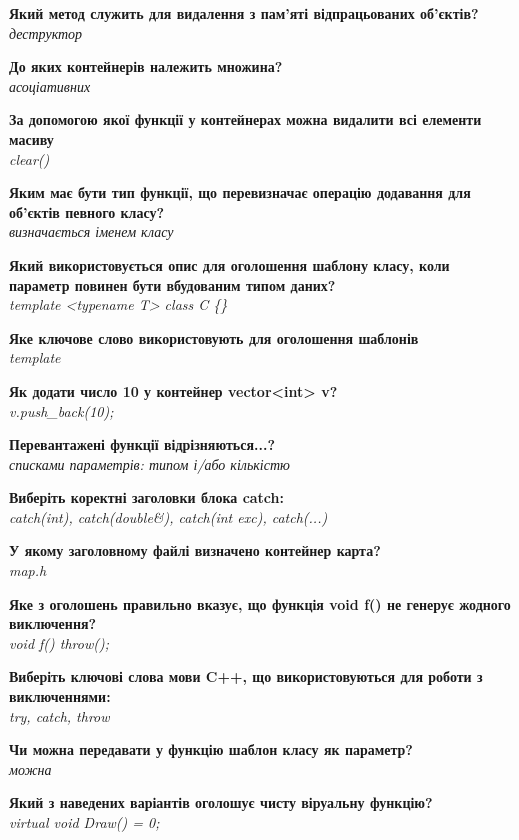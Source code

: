 \documentclass{article}
\begin{document}
\begin{list}{}{}
	\item \textbf{Який метод служить для видалення з пам'яті відпрацьованих об'єктів?} \\ \textit{деструктор}
	\item \textbf{До яких контейнерів належить множина?} \\ \textit{асоціативних}
	\item \textbf{За допомогою якої функції у контейнерах можна видалити всі елементи масиву} \\ \textit{clear()}
	\item \textbf{Яким має бути тип функції, що перевизначає операцію додавання для об'єктів певного класу?} \\ \textit{визначається іменем класу}
	\item \textbf{Який використовується опис для оголошення шаблону класу, коли параметр повинен бути вбудованим типом даних?} \\ \textit{template <typename T> class C \{\}}
	\item \textbf{Яке ключове слово використовують для оголошення шаблонів} \\ \textit{template}
	\item \textbf{Як додати число 10 у контейнер vector<int> v?} \\ \textit{v.push\_back(10);}
	\item \textbf{Перевантажені функції відрізняються...?} \\ \textit{списками параметрів: типом і/або кількістю}
	\item \textbf{Виберіть коректні заголовки блока catch:} \\ \textit{catch(int), catch(double\&), catch(int exc), catch(...)}
	\item \textbf{У якому заголовному файлі визначено контейнер карта?} \\ \textit{map.h}
	\item \textbf{Яке з оголошень правильно вказує, що функція void f() не генерує жодного виключення?} \\ \textit{void f() throw();}
	\item \textbf{Виберіть ключові слова мови C++, що використовуються для роботи з виключеннями:} \\ \textit{try, catch, throw}
	\item \textbf{Чи можна передавати у функцію шаблон класу як параметр?} \\ \textit{можна}
	\item \textbf{Який з наведених варіантів оголошує чисту віруальну функцію?} \\ \textit{virtual void Draw() = 0;}

\end{list}
\end{document}
